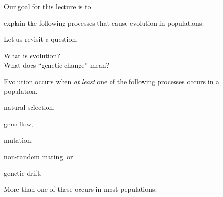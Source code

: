 \documentclass[t]{beamer}
\begin{document}
\begin{frame}{Our goal for this lecture is to }
	
	\hangpara explain the following processes that cause evolution in populations:
	
	\hangpara \hspace*{1em} 
	 
	\hangpara \hspace*{1em} 
	 
	\hangpara \hspace*{1em}  
	
	\hangpara \hspace*{1em}  

\end{frame}
%
%
\begin{frame}[t,plain]{Let us revisit a question.}
	\vspace{2ex}
	
	\hangpara What is evolution? \onslide<2->\\[2\baselineskip]
	

	\onslide<2->\hangpara What does ``genetic change'' mean?

\end{frame}


\begin{frame}{Evolution occurs when \emph{at least} one of the following processes occurs in a population.}
	
	\hangpara natural selection,

	\hangpara gene flow,
	
	\hangpara mutation,
	
	\hangpara non-random mating, or

	\hangpara genetic drift.
	
	\hangpara More than one of these occurs in most populations.
	
\end{frame}
%
\end{document}
